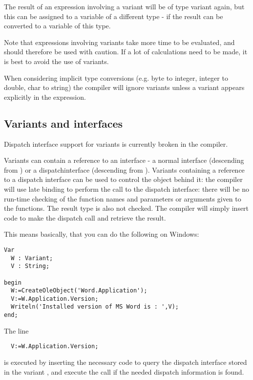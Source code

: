 The result of an expression involving a variant will be of type variant again, 
but this can be assigned to a variable of a different type - if the result
can be converted to a variable of this type.

Note that expressions involving variants take more time to be evaluated, and
should therefore be used with caution. If a lot of calculations need to be
made, it is best to avoid the use of variants.

When considering implicit type conversions (e.g. byte to integer, integer to
double, char to string) the compiler will ignore variants unless a variant
appears explicitly in the expression. 
 
\subsection{Variants and interfaces}
\begin{remark}
Dispatch interface support for variants is currently broken in the compiler.
\end{remark}

Variants can contain a reference to an interface - a normal interface
(descending from ) or a dispatchinterface (descending 
from ). Variants containing a reference to a dispatch
interface can be used to control the object behind it: the compiler will use
late binding to perform the call to the dispatch interface: there will be no
run-time checking of the function names and parameters or arguments given to 
the functions. The result type is also not checked. The compiler will simply
insert code to make the dispatch call and retrieve the result. 

This means basically, that you can do the following on Windows:
\begin{verbatim}
Var
  W : Variant;
  V : String;

begin
  W:=CreateOleObject('Word.Application');
  V:=W.Application.Version;
  Writeln('Installed version of MS Word is : ',V);
end;
\end{verbatim}
The line 
\begin{verbatim}
  V:=W.Application.Version;
\end{verbatim}
is executed by inserting the necessary code to query the dispatch interface
stored in the variant , and execute the call if the needed dispatch
information is found.

